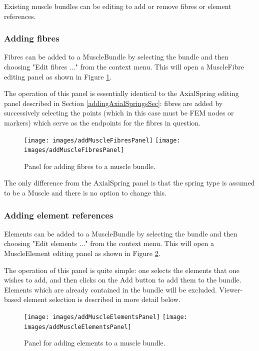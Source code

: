 \documentclass{article}
\begin{document}
Existing muscle bundles can be editing to add or remove fibres or
element references.

\subsubsection{Adding fibres}
\label{addingFibresSec}

Fibres can be added to a MuscleBundle by selecting the bundle and then
choosing {\sf "Edit fibres ..."} from the context menu. This will open
a MuscleFibre editing panel as shown in Figure \ref{addMuscleFibresPanelFig}.

The operation of this panel is essentially identical to
the AxialSpring editing panel described in Section \ref{addingAxialSpringsSec}:
fibres are added by successively selecting the points
(which in this case must be FEM nodes or markers)
which serve as the endpoints for the fibres in question.

\begin{figure}
\begin{center}
\iflatexml
\texttt{[image: images/addMuscleFibresPanel]}
\else
\texttt{[image: images/addMuscleFibresPanel]}
\fi
\end{center}
\caption{Panel for adding fibres to a muscle bundle.}%
\label{addMuscleFibresPanelFig}
\end{figure}

The only difference from the AxialSpring panel is that the spring type
is assumed to be a Muscle and there is no option to change this.

\subsubsection{Adding element references}

Elements can be added to a MuscleBundle by selecting the bundle and then
choosing {\sf "Edit elements ..."} from the context menu. This will open a
MuscleElement editing panel as shown in Figure \ref{addMuscleElementsPanelFig}.

The operation of this panel is quite simple: one selects the elements
that one wishes to add, and then clicks on the {\sf Add} button to add
them to the bundle. Elements which are already contained in the bundle
will be excluded. Viewer-based element selection is described
in more detail below.

\begin{figure}
\begin{center}
\iflatexml
\texttt{[image: images/addMuscleElementsPanel]}
\else
\texttt{[image: images/addMuscleElementsPanel]}
\fi
\end{center}
\caption{Panel for adding elements to a muscle bundle.}%
\label{addMuscleElementsPanelFig}
\end{figure}
\end{document}
